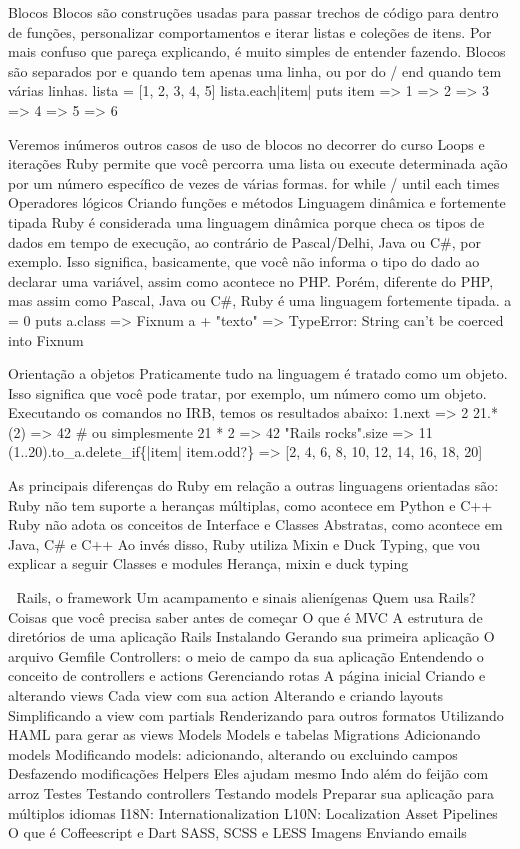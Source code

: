 \documentclass[12pt]{book} %
\begin{document}
Blocos
Blocos são construções usadas para passar trechos de código para dentro de funções, personalizar comportamentos e iterar listas e coleções de itens. Por mais confuso que pareça explicando, é muito simples de entender fazendo.
Blocos são separados por { e } quando tem apenas uma linha, ou por do / end quando tem várias linhas.
lista = [1, 2, 3, 4, 5]
lista.each{|item| puts item}
=> 1
=> 2
=> 3
=> 4
=> 5
=> 6

Veremos inúmeros outros casos de uso de blocos no decorrer do curso
Loops e iterações
Ruby permite que você percorra uma lista ou execute determinada ação por um número específico de vezes de várias formas.
for
while / until
each
times
Operadores lógicos
Criando funções e métodos
Linguagem dinâmica e fortemente tipada
Ruby é considerada uma linguagem dinâmica porque checa os tipos de dados em tempo de execução, ao contrário de Pascal/Delhi, Java ou C\#, por exemplo. Isso significa, basicamente, que você não informa o tipo do dado ao declarar uma variável, assim como acontece no PHP. Porém, diferente do PHP, mas assim como Pascal, Java ou C\#, Ruby é uma linguagem fortemente tipada.
a = 0
puts a.class
=> Fixnum
a + "texto"
=> TypeError: String can't be coerced into Fixnum

Orientação a objetos
Praticamente tudo na linguagem é tratado como um objeto. Isso significa que você pode tratar, por exemplo, um número como um objeto.
Executando os comandos no IRB, temos os resultados abaixo:
1.next
=> 2
21.*(2)
=> 42
\# ou simplesmente
21 * 2
=> 42
"Rails rocks".size
=> 11
(1..20).to\_a.delete\_if\{|item| item.odd?\}
=> [2, 4, 6, 8, 10, 12, 14, 16, 18, 20]


As principais diferenças do Ruby em relação a outras linguagens orientadas são:
Ruby não tem suporte a heranças múltiplas, como acontece em Python e C++
Ruby não adota os conceitos de Interface e Classes Abstratas, como acontece em Java, C\# e C++
Ao invés disso, Ruby utiliza Mixin e Duck Typing, que vou explicar a seguir
Classes e modules
Herança, mixin e duck typing


Rails, o framework
Um acampamento e sinais alienígenas
Quem usa Rails?
Coisas que você precisa saber antes de começar
O que é MVC
A estrutura de diretórios de uma aplicação Rails
Instalando
Gerando sua primeira aplicação
O arquivo Gemfile
Controllers: o meio de campo da sua aplicação
Entendendo o conceito de controllers e actions
Gerenciando rotas
A página inicial
Criando e alterando views
Cada view com sua action
Alterando e criando layouts
Simplificando a view com partials
Renderizando para outros formatos
Utilizando HAML para gerar as views
Models
Models e tabelas
Migrations
Adicionando models
Modificando models: adicionando, alterando ou excluindo campos
Desfazendo modificações
Helpers
Eles ajudam mesmo
Indo além do feijão com arroz
Testes
Testando controllers
Testando models
Preparar sua aplicação para múltiplos idiomas
I18N: Internationalization
L10N: Localization
Asset Pipelines
O que é
Coffeescript e Dart
SASS, SCSS e LESS
Imagens
Enviando emails
\end{document}

